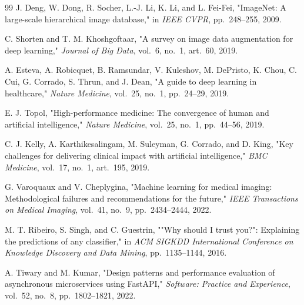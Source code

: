 \documentclass[12pt,a4paper]{report}
\begin{document}
\begin{thebibliography}{99}
J. Deng, W. Dong, R. Socher, L.-J. Li, K. Li, and L. Fei-Fei, "ImageNet: A large-scale hierarchical image database," in \textit{IEEE CVPR}, pp.~248--255, 2009.

C. Shorten and T. M. Khoshgoftaar, "A survey on image data augmentation for deep learning," \textit{Journal of Big Data}, vol.~6, no.~1, art.~60, 2019.

A. Esteva, A. Robicquet, B. Ramsundar, V. Kuleshov, M. DePristo, K. Chou, C. Cui, G. Corrado, S. Thrun, and J. Dean, "A guide to deep learning in healthcare," \textit{Nature Medicine}, vol.~25, no.~1, pp.~24--29, 2019.

E. J. Topol, "High-performance medicine: The convergence of human and artificial intelligence," \textit{Nature Medicine}, vol.~25, no.~1, pp.~44--56, 2019.

C. J. Kelly, A. Karthikesalingam, M. Suleyman, G. Corrado, and D. King, "Key challenges for delivering clinical impact with artificial intelligence," \textit{BMC Medicine}, vol.~17, no.~1, art.~195, 2019.

G. Varoquaux and V. Cheplygina, "Machine learning for medical imaging: Methodological failures and recommendations for the future," \textit{IEEE Transactions on Medical Imaging}, vol.~41, no.~9, pp.~2434--2444, 2022.

M. T. Ribeiro, S. Singh, and C. Guestrin, ""Why should I trust you?": Explaining the predictions of any classifier," in \textit{ACM SIGKDD International Conference on Knowledge Discovery and Data Mining}, pp.~1135--1144, 2016.

A. Tiwary and M. Kumar, "Design patterns and performance evaluation of asynchronous microservices using FastAPI," \textit{Software: Practice and Experience}, vol.~52, no.~8, pp.~1802--1821, 2022.

\end{thebibliography}
\end{document}
